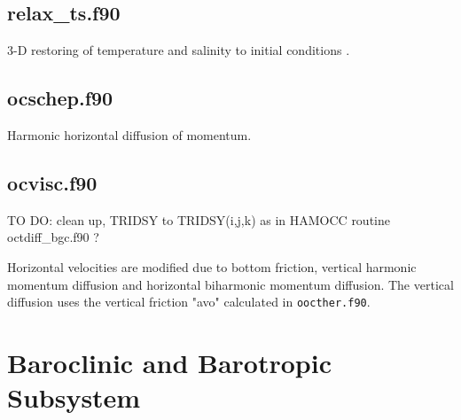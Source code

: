\subsection{relax\_ts.f90}
\label{ch:timestepping:relax-ts}
3-D restoring of temperature and salinity to initial conditions \citep{levitus98}.
\subsection{ocschep.f90}
\label{ch:timestepping:ocschep}
Harmonic horizontal diffusion of momentum.
\subsection{ocvisc.f90}
\label{ch:timestepping:ocvisc}
TO DO: clean up, TRIDSY to TRIDSY(i,j,k) as in HAMOCC routine octdiff\_bgc.f90 ?

Horizontal velocities are modified due to bottom friction, vertical harmonic momentum diffusion 
and horizontal biharmonic momentum diffusion. 
The vertical diffusion uses the vertical friction "avo" calculated in \texttt{oocther.f90}.





\section{Baroclinic and Barotropic Subsystem}
\label{ch:timestepping:subsystem} 

